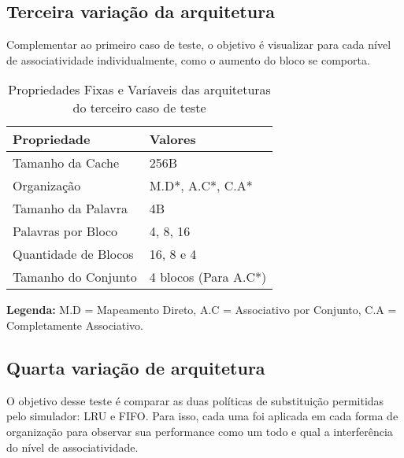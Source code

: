 \documentclass[conference]{IEEEtran}
\begin{document}
\subsection{Terceira variação da arquitetura}
Complementar ao primeiro caso de teste, o objetivo é visualizar para cada nível de associatividade individualmente, como o aumento do bloco se comporta.

\begin{table}[htb]
\centering
\begin{tabular}{|l|l|}
\hline
\textbf{Propriedade}       & \textbf{Valores}         \\ \hline
Tamanho da Cache           & 256B                    \\ \hline
Organização                & M.D*, A.C*, C.A*        \\ \hline
Tamanho da Palavra         & 4B                  \\ \hline
Palavras por Bloco         & 4, 8, 16                \\ \hline
Quantidade de Blocos       & 16, 8 e 4           \\ \hline
Tamanho do Conjunto        & 4 blocos (Para A.C*)    \\ \hline
\end{tabular}
\caption{Propriedades Fixas e Varíaveis das arquiteturas do terceiro caso de teste}
\label{tab:propriedades}
\vspace{0.5cm}
\footnotesize
\textbf{Legenda:} M.D = Mapeamento Direto, A.C = Associativo por Conjunto, C.A = Completamente Associativo.
\end{table}

\subsection{Quarta variação de arquitetura}
O objetivo desse teste é comparar as duas políticas de substituição permitidas pelo simulador: LRU e FIFO. Para isso, cada uma foi aplicada em cada forma de organização para observar sua performance como um todo e qual a interferência do nível de associatividade.
\end{document}
